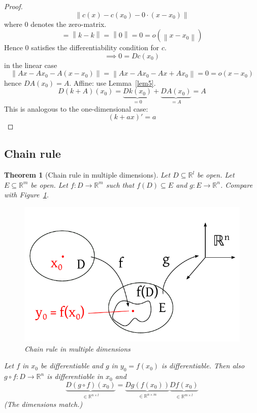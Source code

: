 \documentclass{article}
\newtheorem{theorem}{Theorem}  \numberwithin{theorem}{section}
\newcommand{\norm}[1]{\left\|#1\right\|}
\begin{document}
\begin{proof}
  \[ \norm{c(x) - c(x_0) - 0 \cdot (x - x_0)} \]
  where $0$ denotes the zero-matrix.
  \[ = \norm{k - k} = \norm{0} = 0 = o(\norm{x - x_0}) \]
  Hence $0$ satisfies the differentiability condition for $c$.
  \[ \implies 0 = Dc(x_0) \]
  in the linear case
  \[ \norm{Ax - Ax_0 - A(x - x_0)} = \norm{Ax - Ax_0 - Ax + Ax_0} = 0 = o({x - x_0}) \]
  hence $DA(x_0) = A$.
  Affine: use Lemma~\ref{lem5}.
  \[ D(k + A)(x_0) = \underbrace{Dk(x_0)}_{=0} + \underbrace{DA(x_0)}_{= A} = A \]
  This is analogous to the one-dimensional case:
  \[ (k + ax)' = a \]
\end{proof}

\subsection{Chain rule}
\begin{theorem}[Chain rule in multiple dimensions]
  Let $D \subseteq \mathbb R^l$ be open. Let $E \subseteq \mathbb R^m$ be open.
  Let $f: D \to \mathbb R^m$ such that $f(D) \subseteq E$ and $g: E \to \mathbb R^n$.
  Compare with Figure~\ref{chainrule}.

  \begin{figure}[t]
    \begin{center}
      \includegraphics[width=.6\textwidth]{img/30_fg.pdf}
      \caption{Chain rule in multiple dimensions}
      \label{chainrule}
    \end{center}
  \end{figure}

  Let $f$ in $x_0$ be differentiable and $g$ in $y_0 = f(x_0)$ is differentiable.
  Then also $g \circ f: D \to \mathbb R^n$ is differentiable in $x_0$ and
  \[ \underbrace{D(g \circ f)(x_0)}_{\in \mathbb R^{n \times l}} = \underbrace{Dg(f(x_0))}_{\in \mathbb R^{n \times m}} \underbrace{Df(x_0)}_{\in \mathbb R^{m \times l}} \]
  (The dimensions match.)
\end{theorem}
\end{document}
